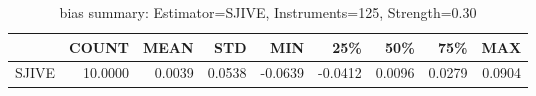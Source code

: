 \begin{table}[ht]
\centering
\caption{bias summary: Estimator=SJIVE, Instruments=125, Strength=0.30}
\begin{tabular}{lrrrrrrrr}
\toprule
 & COUNT & MEAN & STD & MIN & 25\% & 50\% & 75\% & MAX \\
\midrule
SJIVE & 10.0000 & 0.0039 & 0.0538 & -0.0639 & -0.0412 & 0.0096 & 0.0279 & 0.0904 \\
\bottomrule
\end{tabular}
\end{table}
